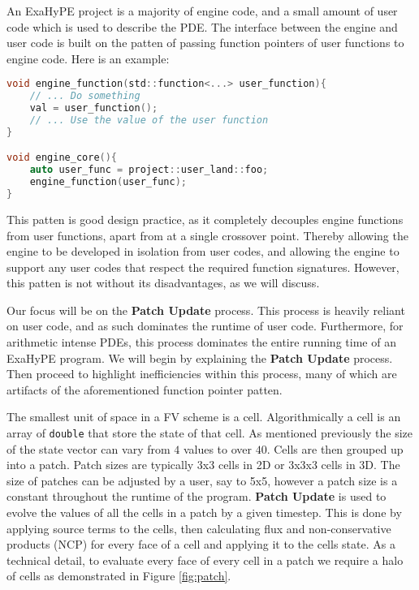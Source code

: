 \newcommand{\proc}[1]{\textbf{#1}}

An ExaHyPE project is a majority of engine code, and a small amount of user code which is used to describe the PDE.
The interface between the engine and user code is built on the patten of passing function pointers of user functions to engine code.
Here is an example:
\begin{lstlisting}[language=c]
void engine_function(std::function<...> user_function){
    // ... Do something
    val = user_function();
    // ... Use the value of the user function 
}

void engine_core(){
    auto user_func = project::user_land::foo;
    engine_function(user_func);
}
\end{lstlisting}

This patten is good design practice, as it completely decouples engine functions from user functions, apart from at a single crossover point.
Thereby allowing the engine to be developed in isolation from user codes, and allowing the engine to support any user codes that respect the required function signatures.
However, this patten is not without its disadvantages, as we will discuss.

Our focus will be on the \proc{Patch Update} process.
This process is heavily reliant on user code, and as such dominates the runtime of user code.
Furthermore, for arithmetic intense PDEs, this process dominates the entire running time of an ExaHyPE program.
We will begin by explaining the \proc{Patch Update} process.
Then proceed to highlight inefficiencies within this process, many of which are artifacts of the aforementioned function pointer patten. 

The smallest unit of space in a FV scheme is a cell.
Algorithmically a cell is an array of \lstinline{double} that store the state of that cell.
As mentioned previously the size of the state vector can vary from $4$ values to over $40$.
Cells are then grouped up into a patch.
Patch sizes are typically 3x3 cells in 2D or 3x3x3 cells in 3D.
The size of patches can be adjusted by a user, say to 5x5, however a patch size is a constant throughout the runtime of the program.
\proc{Patch Update} is used to evolve the values of all the cells in a patch by a given timestep.
This is done by applying source terms to the cells, then calculating flux and non-conservative products (NCP) for every face of a cell and applying it to the cells state.
As a technical detail, to evaluate every face of every cell in a patch we require a halo of cells as demonstrated in Figure \ref{fig:patch}.

